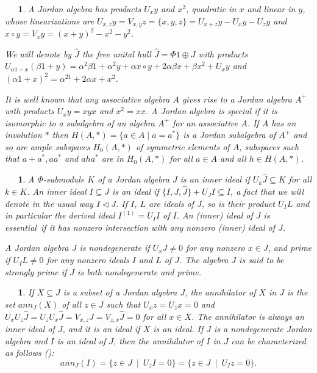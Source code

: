 \documentclass[a4paper,twoside,11pt]{article}
\theoremstyle{plain}
\theoremstyle{miestilo}
\theoremstyle{misnotas}
\newtheorem{apartado}[subsection]{\ {\ }}
\begin{document}
\begin{apartado}A Jordan algebra has products   $U_xy$ and $x^2$, quadratic in $x$
and linear in $y$, whose linearizations are
 $U_{x,z}y=V_{x,y}z=\{x,y,z\}=U_{x+z}y-U_xy-U_zy$ and $x\circ y=V_xy=(x+y)^2-x^2-y^2$.

 We will denote by $\widehat{J} $ the free unital hull $\widehat{J}=\Phi 1\oplus
 J$ with products $U_{\alpha
 1+x}(\beta1+y)=\alpha^2\beta1+\alpha^2y+\alpha x\circ
 y+2\alpha\beta x+\beta x^2+U_xy$ and
 $(\alpha1+x)^2=\alpha^21+2\alpha x +x^2$.

It is well known that  any associative algebra $A$ gives rise to a Jordan algebra $A^+$ with products $U_xy=xyx$ and $x^2=xx$. A Jordan algebra is special if it is isomorphic to a subalgebra of an algebra $A^+$ for an associative $A$. If $A$ has an involution $\ast$ then $H(A,\ast)=\{a\in A\mid a=a^\ast\}$ is a Jordan subalgebra of $A^+$ and so are ample subspaces $H_0(A,\ast)$ of symmetric elements of $A$, subspaces such that $a+a^\ast, aa^\ast$ and $aha^\ast$ are in $H_0(A,\ast)$ for all $a\in A $ and all $h\in H(A,\ast)$.
\end{apartado}




\begin{apartado} A $\Phi$-submodule $K$ of a Jordan algebra $J$ is
an \emph{inner ideal} if $U_k\widehat{J}\subseteq K$ for all $k\in
K$. An inner ideal $I\subseteq J$ is an \emph{ideal} if
$\{I,J,\widehat{J}\}+U_JI\subseteq I$, a fact that we will denote in the usual way $I\triangleleft J$. If $I$, $L$ are ideals of
$J$, so is their product $U_IL$  and in particular   the
\emph{derived ideal} $I^{(1)}=U_II$ of $I$. An (inner) ideal  of $J$ is
\emph{essential}\  if it has nonzero intersection  with any
nonzero (inner) ideal of $J$.

A Jordan algebra $J$ is \emph{nondegenerate} if $U_xJ\neq0$ for any nonzero $x\in J$, and \emph{prime} if $U_IL\neq0$ for any nonzero ideals $I$ and $L$ of $J$. The algebra $J$ is said to be \emph{strongly prime} if $J$ is both nondegenerate and prime.
\end{apartado}

\begin{apartado}\label{annihilator_def}
If $X\subseteq J$ is a subset of a Jordan algebra $J$, the
\emph{annihilator} of $X$ in $J$ is the set $ann_J(X)$ of all
$z\in J$ such that $U_xz=U_zx=0$ and
$U_xU_z\widehat{J}=U_zU_x\widehat{J}=V_{x,z}\widehat{J}=V_{z,x}\widehat{J}=0$
for all $x\in X$. The annihilator  is always an inner ideal of $J$,
and it is an ideal if $X$ is an ideal. If $J$ is a nondegenerate
Jordan algebra  and $I$ is an ideal of $J$, then the annihilator
of $I$ in $J$ can be characterized as follows
(\cite{mc-inh,pi-ii}):
$$ann_J(I)=\{z\in J\ \mid\ U_zI=0\}=\{z\in J\ \mid\ U_Iz=0\}.$$
\end{apartado}
\end{document}
